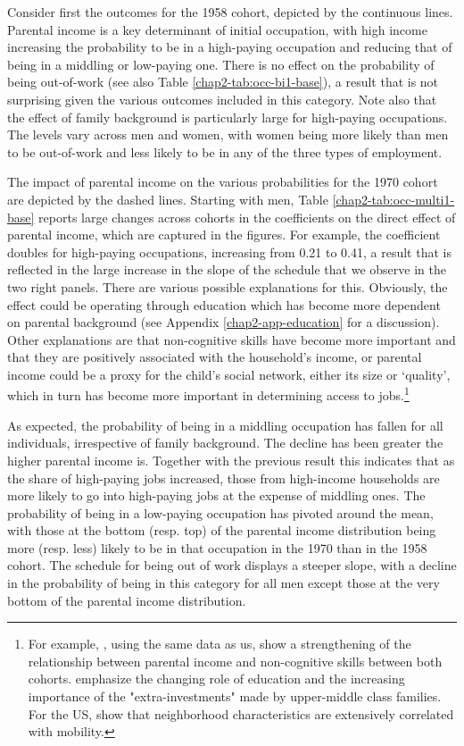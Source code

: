 Consider first the outcomes for the 1958 cohort, depicted by the continuous lines. Parental income is a key determinant of initial occupation, with high income increasing the probability to be in a high-paying occupation and reducing that of being in a middling or low-paying one. There is no effect on the probability of being out-of-work (see also Table \ref{chap2-tab:occ-bi1-base}), a result that is not surprising given the various outcomes included in this category. Note also that the effect of family background is particularly large for high-paying occupations. The levels vary across men and women, with women being more likely than men to be out-of-work and less likely to be in any of the three types of employment.

The impact of parental income on the various probabilities for the 1970 cohort are depicted by the dashed lines. Starting with men, Table \ref{chap2-tab:occ-multi1-base} reports large changes across cohorts in the coefficients on the direct effect of parental income, which are captured in the figures. For example, the coefficient doubles for high-paying occupations, increasing from 0.21 to 0.41, a result that is reflected in the large increase in the slope of the schedule that we observe in the two right panels. There are various possible explanations for this. Obviously, the effect could be operating through education which has become more dependent on parental background (see Appendix \ref{chap2-app-education} for a discussion). Other explanations are that non-cognitive skills have become more important and that they are positively associated with the household’s income, or parental income could be a proxy for the child’s social network, either its size or ‘quality’, which in turn has become more important in determining access to jobs.\footnote{For example, \cite{Blanden2007Accounting}, using the same data as us, show a strengthening of the relationship between parental income and non-cognitive skills between both cohorts. \cite{Major2018Social} emphasize the changing role of education and the increasing importance of the "extra-investments" made by upper-middle class families. For the US, \cite{Chetty2014Land} show that neighborhood characteristics are extensively correlated with mobility.}

As expected, the probability of being in a middling occupation has fallen for all individuals, irrespective of family background. The decline has been greater the higher parental income is. Together with the previous result this indicates that as the share of high-paying jobs increased, those from high-income households are more likely to go into high-paying jobs at the expense of middling ones. The probability of being in a low-paying occupation has pivoted around the mean, with those at the bottom (resp. top) of the parental income distribution being more (resp. less) likely to be in that occupation in the 1970 than in the 1958 cohort. The schedule for being out of work displays a steeper slope, with a decline in the probability of being in this category for all men except those at the very bottom of the parental income distribution.


